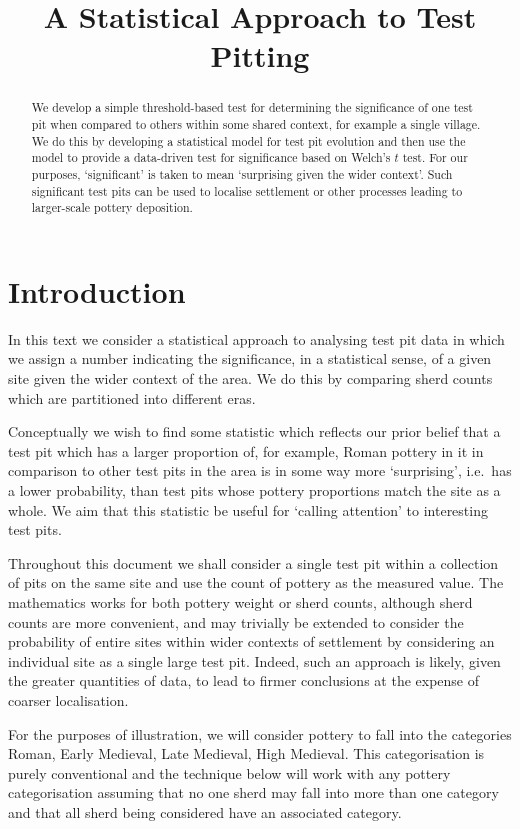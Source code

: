 \documentclass[conference]{IEEEtran}
\title{A Statistical Approach to Test Pitting}
\author{%
    \IEEEauthorblockN{Rich Wareham}
    \IEEEauthorblockA{Signal Processing and Communications Laboratory\\
    Department of Engineering, University of Cambridge\\
    Email: rjw57@cam.ac.uk}
}
\begin{document}
\maketitle

\begin{abstract}
    We develop a simple threshold-based test for determining the significance of
    one test pit when compared to others within some shared context, for example
    a single village. We do this by developing a statistical model for test pit
    evolution and then use the model to provide a data-driven test for
    significance based on Welch's $t$ test\cite{welch}. For our purposes,
    `significant' is taken to mean `surprising given the wider context'. Such
    significant test pits can be used to localise settlement or other processes
    leading to larger-scale pottery deposition.
\end{abstract}

\section{Introduction}

In this text we consider a statistical approach to analysing test pit data in
which we assign a number indicating the significance, in a statistical sense,
of a given site given the wider context of the area. We do this by comparing
sherd counts which are partitioned into different eras.

Conceptually we wish to find some statistic which reflects our prior belief that a
test pit which has a larger proportion of, for example, Roman pottery in it in
comparison to other test pits in the area is in some way more `surprising',
i.e.\ has a lower probability, than test pits whose pottery proportions match
the site as a whole. We aim that this statistic be useful for `calling
attention' to interesting test pits.

Throughout this document we shall consider a single test pit within a collection
of pits on the same site and use the count of pottery as the measured value.
The mathematics works for both pottery weight or sherd counts, although sherd
counts are more convenient, and may trivially be extended to consider the
probability of entire sites within wider contexts of settlement by considering
an individual site as a single large test pit. Indeed, such an approach is
likely, given the greater quantities of data, to lead to firmer conclusions at
the expense of coarser localisation.

For the purposes of illustration, we will consider pottery to fall into the
categories Roman, Early Medieval, Late Medieval, High Medieval. This
categorisation is purely conventional and the technique below will work with any
pottery categorisation assuming that no one sherd may fall into more than one
category and that all sherd being considered have an associated category.
\end{document}
